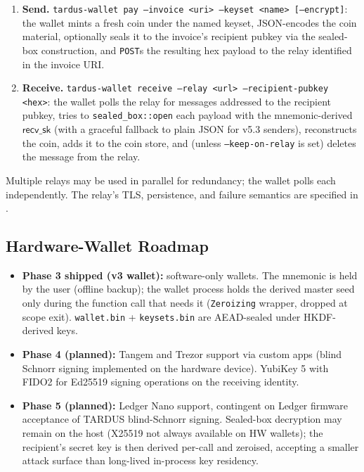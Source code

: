 \begin{enumerate}[leftmargin=2em,itemsep=0pt]
  \item \textbf{Send.} \texttt{tardus-wallet pay --invoice <uri> --keyset
        <name> [--encrypt]}: the wallet mints a fresh coin under the
        named keyset, JSON-encodes the coin material, optionally seals
        it to the invoice's recipient pubkey via the
         sealed-box construction, and
        \texttt{POST}s the resulting hex payload to the relay
        identified in the invoice URI.
  \item \textbf{Receive.} \texttt{tardus-wallet receive --relay <url>
        --recipient-pubkey <hex>}: the wallet polls the relay for
        messages addressed to the recipient pubkey, tries to
        \texttt{sealed\_box::open} each payload with the
        mnemonic-derived $\mathsf{recv\_sk}$ (with a graceful
        fallback to plain JSON for v5.3 senders), reconstructs the
        coin, adds it to the coin store, and (unless
        \texttt{--keep-on-relay} is set) deletes the message from the
        relay.
\end{enumerate}

Multiple relays may be used in parallel for redundancy; the wallet
polls each independently. The relay's TLS, persistence, and failure
semantics are specified in .

\subsection{Hardware-Wallet Roadmap}
\label{sec:wallet-hw}

\begin{itemize}[leftmargin=2em,itemsep=0pt]
  \item \textbf{Phase 3 shipped (v3 wallet):} software-only wallets.
        The mnemonic is held by the user (offline backup); the wallet
        process holds the derived master seed only during the
        function call that needs it (\texttt{Zeroizing} wrapper, dropped
        at scope exit). \texttt{wallet.bin} + \texttt{keysets.bin} are
        AEAD-sealed under HKDF-derived keys.
  \item \textbf{Phase 4 (planned):} Tangem and Trezor support via
        custom apps (blind Schnorr signing implemented on the hardware
        device). YubiKey 5 with FIDO2 for Ed25519 signing operations
        on the receiving identity.
  \item \textbf{Phase 5 (planned):} Ledger Nano support, contingent on
        Ledger firmware acceptance of TARDUS blind-Schnorr signing.
        Sealed-box decryption may remain on the host (X25519 not
        always available on HW wallets); the recipient's secret key
        is then derived per-call and zeroised, accepting a smaller
        attack surface than long-lived in-process key residency.
\end{itemize}


